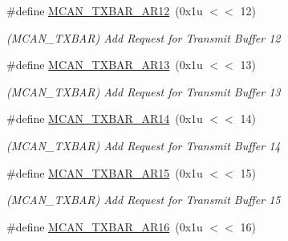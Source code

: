 \begin{DoxyCompactItemize}
\mbox{\label{group__SAMV71__MCAN_gab229ceb5f4ba72c2e69b1c42f4639e5a}} 
\#define \mbox{\hyperlink{group__SAMV71__MCAN_gab229ceb5f4ba72c2e69b1c42f4639e5a}{M\+C\+A\+N\+\_\+\+T\+X\+B\+A\+R\+\_\+\+A\+R12}}~(0x1u $<$$<$ 12)
\begin{DoxyCompactList}\small\item\em (M\+C\+A\+N\+\_\+\+T\+X\+B\+AR) Add Request for Transmit Buffer 12 \end{DoxyCompactList}\item 
\mbox{\label{group__SAMV71__MCAN_ga0a42652f8582f0be16dcddb64d220a2e}} 
\#define \mbox{\hyperlink{group__SAMV71__MCAN_ga0a42652f8582f0be16dcddb64d220a2e}{M\+C\+A\+N\+\_\+\+T\+X\+B\+A\+R\+\_\+\+A\+R13}}~(0x1u $<$$<$ 13)
\begin{DoxyCompactList}\small\item\em (M\+C\+A\+N\+\_\+\+T\+X\+B\+AR) Add Request for Transmit Buffer 13 \end{DoxyCompactList}\item 
\mbox{\label{group__SAMV71__MCAN_gac67e9af953bd01506eeadfedbd4987fb}} 
\#define \mbox{\hyperlink{group__SAMV71__MCAN_gac67e9af953bd01506eeadfedbd4987fb}{M\+C\+A\+N\+\_\+\+T\+X\+B\+A\+R\+\_\+\+A\+R14}}~(0x1u $<$$<$ 14)
\begin{DoxyCompactList}\small\item\em (M\+C\+A\+N\+\_\+\+T\+X\+B\+AR) Add Request for Transmit Buffer 14 \end{DoxyCompactList}\item 
\mbox{\label{group__SAMV71__MCAN_ga388a8aa3552452d462fee1e4696b7d1b}} 
\#define \mbox{\hyperlink{group__SAMV71__MCAN_ga388a8aa3552452d462fee1e4696b7d1b}{M\+C\+A\+N\+\_\+\+T\+X\+B\+A\+R\+\_\+\+A\+R15}}~(0x1u $<$$<$ 15)
\begin{DoxyCompactList}\small\item\em (M\+C\+A\+N\+\_\+\+T\+X\+B\+AR) Add Request for Transmit Buffer 15 \end{DoxyCompactList}\item 
\mbox{\label{group__SAMV71__MCAN_ga05eaf47bd5ad65e78fb586cdf94fb755}} 
\#define \mbox{\hyperlink{group__SAMV71__MCAN_ga05eaf47bd5ad65e78fb586cdf94fb755}{M\+C\+A\+N\+\_\+\+T\+X\+B\+A\+R\+\_\+\+A\+R16}}~(0x1u $<$$<$ 16)
$$
\end{DoxyCompactItemize}
